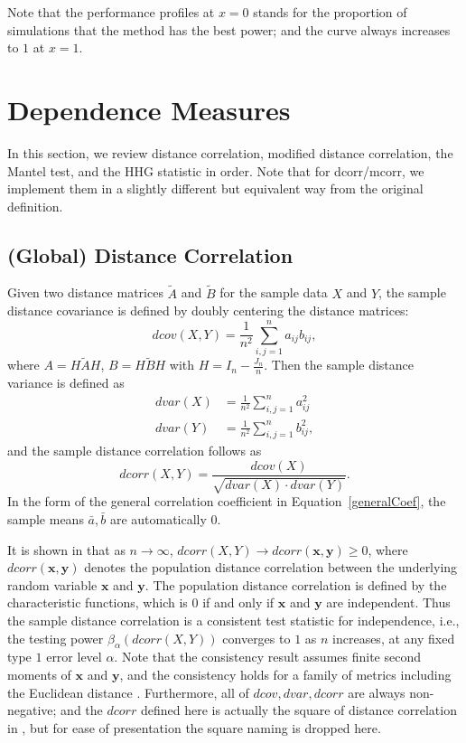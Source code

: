 \documentclass[11pt]{article}
\providecommand{\mb}[1]{\boldsymbol{#1}}
\begin{document}
Note that the performance profiles at $x=0$ stands for the proportion of simulations that the method has the best power; and the curve always increases to $1$ at $x=1$. 

\section{Dependence Measures}
\label{appen:methods}

In this section, we review distance correlation, modified distance correlation, the Mantel test, and the HHG statistic in order. Note that for dcorr/mcorr, we implement them in a slightly different but equivalent way from the original definition.

\subsection{(Global) Distance Correlation}
\label{appen:dcorr}
Given two distance matrices $\tilde{A}$ and $\tilde{B}$ for the sample data $X$ and $Y$, the sample distance covariance is defined by doubly centering the distance matrices:
\begin{equation}
\label{dcovEqu}
dcov(X,Y)=\frac{1}{n^2}\sum_{i,j=1}^{n}a_{ij}b_{ij},
\end{equation}
where $A=H\tilde{A}H$, $B=H\tilde{B}H$ with $H=I_{n}-\frac{J_{n}}{n}$. Then the sample distance variance is defined as
\begin{align*}
dvar(X) &=\frac{1}{n^2}\sum_{i,j=1}^{n}a_{ij}^{2}\\
dvar(Y) &=\frac{1}{n^2}\sum_{i,j=1}^{n}b_{ij}^{2},
\end{align*}
and the sample distance correlation follows as
\begin{equation}
\label{dcorrEqu}
dcorr(X,Y)=\frac{dcov(X)}{\sqrt{dvar(X) \cdot dvar(Y)}}.
\end{equation}
In the form of the general correlation coefficient in Equation~\ref{generalCoef}, the sample means $\bar{a}, \bar{b}$ are automatically $0$.

It is shown in \cite{SzekelyRizzoBakirov2007} that as $n \rightarrow \infty$, $dcorr(X,Y) \rightarrow dcorr(\mb{x},\mb{y}) \geq 0$, where $dcorr(\mb{x},\mb{y})$ denotes the population distance correlation between the underlying random variable $\mb{x}$ and $\mb{y}$. The population distance correlation is defined by the characteristic functions, which is $0$ if and only if $\mb{x}$ and $\mb{y}$ are independent. Thus the sample distance correlation is a consistent test statistic for independence, i.e., the testing power $\beta_{\alpha}(dcorr(X,Y))$ converges to $1$ as $n$ increases, at any fixed type $1$ error level $\alpha$. Note that the consistency result assumes finite second moments of $\mb{x}$ and $\mb{y}$, and the consistency holds for a family of metrics including the Euclidean distance \cite{Lyons2013}. Furthermore, all of $dcov, dvar, dcorr$ are always non-negative; and the $dcorr$ defined here is actually the square of distance correlation in \cite{SzekelyRizzoBakirov2007}, but for ease of presentation the square naming is dropped here.
\end{document}
